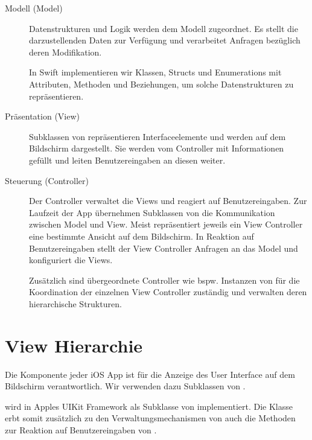 \documentclass[parskip=half, final]{scrreprt}
\begin{document}

\begin{description}
\item[Modell (Model)] Datenstrukturen und Logik werden dem Modell zugeordnet. Es stellt die darzustellenden Daten zur Verfügung und verarbeitet Anfragen bezüglich deren Modifikation.

In Swift implementieren wir Klassen, Structs und Enumerations mit Attributen, Methoden und Beziehungen, um solche Datenstrukturen zu repräsentieren.

\item[Präsentation (View)] Subklassen von  repräsentieren Interfaceelemente und werden auf dem Bildschirm dargestellt. Sie werden vom Controller mit Informationen gefüllt und leiten Benutzereingaben an diesen weiter. 

\item[Steuerung (Controller)] Der Controller verwaltet die Views und reagiert auf Benutzereingaben. Zur Laufzeit der App übernehmen Subklassen von  die Kommunikation zwischen Model und View. Meist repräsentiert jeweils ein View Controller eine bestimmte Ansicht auf dem Bildschirm. In Reaktion auf Benutzereingaben stellt der View Controller Anfragen an das Model und konfiguriert die Views.

Zusätzlich sind übergeordnete Controller wie bspw. Instanzen von  für die Koordination der einzelnen View Controller zuständig und verwalten deren hierarchische Strukturen.
\end{description}


\section{View Hierarchie}\label{sec:viewhierarchy}

\mvcindicatorview

Die  Komponente jeder iOS App ist für die Anzeige des User Interface auf dem Bildschirm verantwortlich. Wir verwenden dazu Subklassen von .

 wird in Apples UIKit Framework als Subklasse von  implementiert. Die Klasse erbt somit zusätzlich zu den Verwaltungsmechanismen von  auch die Methoden zur Reaktion auf Benutzereingaben von .
\end{document}
